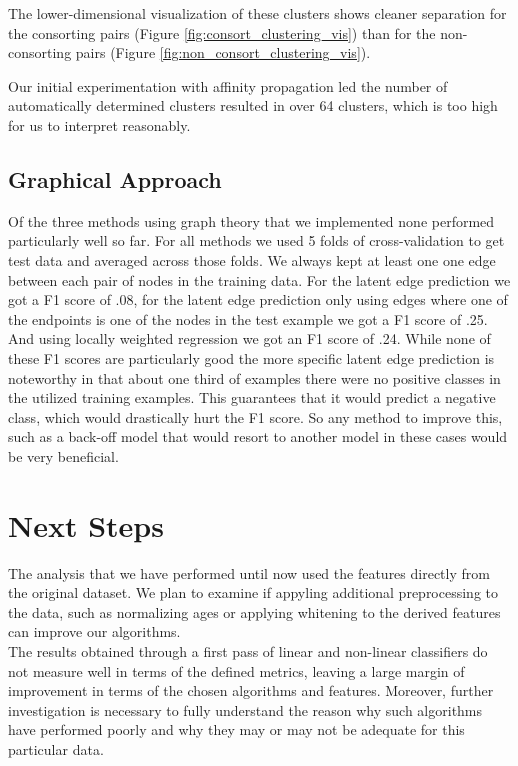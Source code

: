 \documentclass[twoside,twocolumn,paper=letter]{article}
\begin{document}
The lower-dimensional visualization of these clusters shows cleaner separation
for the consorting pairs (Figure \ref{fig:consort_clustering_vis}) than for the
non-consorting pairs (Figure \ref{fig:non_consort_clustering_vis}).

Our initial experimentation with affinity propagation led the number of
automatically determined clusters resulted in over 64 clusters, which is too
high for us to interpret reasonably.

\subsection{Graphical Approach}

Of the three methods using graph theory that we implemented none performed particularly well so far. For all methods we used 5 folds of cross-validation to get test data and averaged across those folds. We always kept at least one one edge between each pair of nodes in the training data. For the latent edge prediction we got a F1 score of .08, for the latent edge prediction only using edges where one of the endpoints is one of the nodes in the test example we got a F1 score of .25. And using locally weighted regression we got an F1 score of .24. While none of these F1 scores are particularly good the more specific latent edge prediction is noteworthy in that about one third of examples there were no positive classes in the utilized training examples. This guarantees that it would predict a negative class, which would drastically hurt the F1 score. So any method to improve this, such as a back-off model that would resort to another model in these cases would be very beneficial.
\section{Next Steps}

The analysis that we have performed until now used the features directly from
the original dataset. We plan to examine if appyling additional preprocessing to
the data, such as normalizing ages or applying whitening to the derived features
can improve our algorithms.\\

The results obtained through a first pass of linear and non-linear classifiers do not measure well in terms of the defined metrics, leaving a large margin of improvement in terms of the chosen algorithms and features. Moreover, further investigation is necessary to fully understand  the reason why such algorithms have performed poorly and why they may or may not be adequate for this particular data. \\
\end{document}
